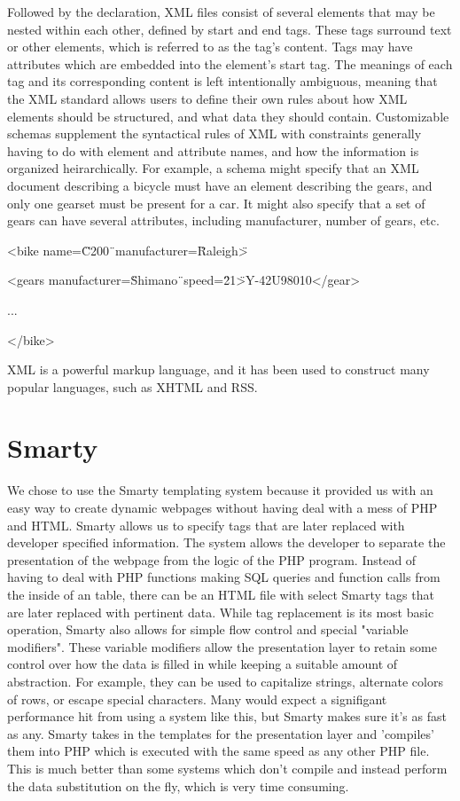 \documentclass[a4paper,12pt]{report}
\begin{document}
\begin{description}
Followed by the declaration, XML files consist of several elements that may be nested within each other, defined by start and end tags.
These tags surround text or other elements, which is referred to as the tag's content.
Tags may have attributes which are embedded into the element's start tag. 
The meanings of each tag and its corresponding content is left intentionally ambiguous, meaning that the XML standard allows users to define their own rules about how XML elements should be structured, and what data they should contain. 
Customizable schemas supplement the syntactical rules of XML with constraints generally having to do with element and attribute names, and how the information is organized heirarchically. 
For example, a schema might specify that an XML document describing a bicycle must have an element describing the gears, and only one gearset must be present for a car. 
It might also specify that a set of gears can have several attributes, including manufacturer, number of gears, etc. 


<bike name=\"C200\"\ manufacturer=\"Raleigh\">

<gears manufacturer=\"Shimano\"\ speed=\"21\">Y-42U98010</gear>

...

</bike>


XML is a powerful markup language, and it has been used to construct many popular languages, such as XHTML and RSS.


\section{Smarty}
We chose to use the Smarty templating system because it provided us with an easy way to create dynamic webpages without having deal with a mess of PHP and HTML. 
Smarty allows us to specify tags that are later replaced with developer specified information.
The system allows the developer to separate the presentation of the webpage from the logic of the PHP program. 
Instead of having to deal with PHP functions making SQL queries and function calls from the inside of an table, there can be an HTML file with select Smarty tags that are later replaced with pertinent data.
While tag replacement is its most basic operation, Smarty also allows for simple flow control and special "variable modifiers".
These variable modifiers allow the presentation layer to retain some control over how the data is filled in while keeping a suitable amount of abstraction.
For example, they can be used to capitalize strings, alternate colors of rows, or escape special characters.
Many would expect a signifigant performance hit from using a system like this, but Smarty makes sure it's as fast as any.
Smarty takes in the templates for the presentation layer and 'compiles' them into PHP which is executed with the same speed as any other PHP file.
This is much better than some systems which don't compile and instead perform the data substitution on the fly, which is very time consuming. 



\end{description}
\end{document}
